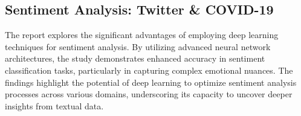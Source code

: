 \subsection{Sentiment Analysis: Twitter \& COVID-19 \cite{background3}}
\vspace{-1em}
The report explores the significant advantages of employing deep learning techniques for sentiment analysis. By utilizing advanced neural network architectures, the study demonstrates enhanced accuracy in sentiment classification tasks, particularly in capturing complex emotional nuances. The findings highlight the potential of deep learning to optimize sentiment analysis processes across various domains, underscoring its capacity to uncover deeper insights from textual data.
\vspace{-1em}
